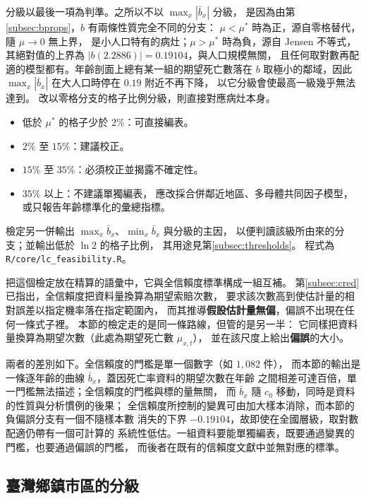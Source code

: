 \documentclass[UTF8, fontset=macnew, a4paper, 12pt]{ctexart}
\begin{document}
分級以最後一項為判準。之所以不以 $\max_x|\bar b_x|$ 分級，
是因為由第\ref{subsec:bprops}，$b$ 有兩條性質完全不同的分支：
$\mu<\mu^{\ast}$ 時為正，源自零格替代，隨 $\mu\to0$ 無上界，
是小人口特有的病灶；$\mu>\mu^{\ast}$ 時為負，源自 Jensen 不等式，
其絕對值的上界為 $|b(2.2886)|=0.19104$，與人口規模無關，
且任何取對數再配適的模型都有。年齡剖面上總有某一組的期望死亡數落在
$b$ 取極小的鄰域，因此 $\max_x|\bar b_x|$ 在大人口時停在 $0.19$ 附近不再下降，
以它分級會使最高一級幾乎無法達到。
改以零格分支的格子比例分級，則直接對應病灶本身。

\begin{itemize}[leftmargin=2.4em]
  \item[\textbf{A}] 低於 $\mu^{\ast}$ 的格子少於 $2\%$：可直接編表。
  \item[\textbf{B}] $2\%$ 至 $15\%$：建議校正。
  \item[\textbf{C}] $15\%$ 至 $35\%$：必須校正並揭露不確定性。
  \item[\textbf{D}] $35\%$ 以上：不建議單獨編表，
        應改採合併鄰近地區、多母體共同因子模型，或只報告年齡標準化的彙總指標。
\end{itemize}

檢定另一併輸出 $\max_x\bar b_x$、$\min_x\bar b_x$ 與分級的主因，
以便判讀該級所由來的分支；並輸出低於 $\ln2$ 的格子比例，
其用途見第\ref{subsec:thresholds}。
程式為 \texttt{R/core/lc\_feasibility.R}。


把這個檢定放在精算的語彙中，它與全信賴度標準構成一組互補。
第\ref{subsec:cred}已指出，全信賴度把資料量換算為期望索賠次數，
要求該次數高到使估計量的相對誤差以指定機率落在指定範圍內，
而其推導\textbf{假設估計量無偏}，偏誤不出現在任何一條式子裡。
本節的檢定走的是同一條路線，但管的是另一半：
它同樣把資料量換算為期望次數（此處為期望死亡數 $\mu_{x,t}$），
並在該尺度上給出\textbf{偏誤}的大小。

兩者的差別如下。全信賴度的門檻是單一個數字（如 $1{,}082$ 件），
而本節的輸出是一條逐年齡的曲線 $\bar b_x$，蓋因死亡率資料的期望次數在年齡
之間相差可達百倍，單一門檻無法描述；全信賴度的門檻與標的量無關，
而 $\bar b_x$ 隨 $c_0$ 移動，同時是資料的性質與分析慣例的後果；
全信賴度所控制的變異可由加大樣本消除，而本節的負偏誤分支有一個不隨樣本數
消失的下界 $-0.19104$，故即使在全國層級，取對數配適仍帶有一個可計算的
系統性低估。一組資料要能單獨編表，既要通過變異的門檻，也要通過偏誤的門檻，
而後者在既有的信賴度文獻中並無對應的標準。

\subsection{臺灣鄉鎮市區的分級}\label{subsec:grade}
\end{document}
